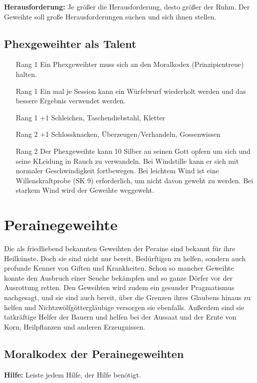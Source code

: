 \documentclass[../../Heldenanleitung2]{subfiles}
\begin{document}
\noindent
\textbf{Herausforderung:} Je größer die Herausforderung, desto
größer der Ruhm. Der Geweihte soll große Herausforderungen
suchen und sich ihnen stellen.

\subsection{Phexgeweihter als Talent}
\begin{itemize}
	\item[Rang 1] Ein Phexgeweihter muss sich an den Moralkodex
(Prinzipientreue) halten.
	\item[Rang 1] Ein mal je Session kann ein Würfelwurf wiederholt werden und das bessere Ergebnis verwendet werden.
	\item[Rang 1] +1 Schleichen, Taschendiebstahl, Kletter
	\item[Rang 2] +1 Schlossknacken, Überzeugen/Verhandeln, Gossenwissen
	\item[Rang 2] Der Phexgeweihte kann 10 Silber an seinen Gott opfern um sich und seine KLeidung in Rauch zu verwandeln. Bei Windstille kann er sich mit normaler Geschwindigkeit fortbewegen. Bei leichtem Wind ist eine Willenskraftprobe (SK 9) erforderlich, um nicht davon geweht zu werden. Bei starkem Wind wird der Geweihte weggeweht.
\end{itemize}

\section{Perainegeweihte}

Die als friedliebend bekannten
Geweihten der
Peraine sind bekannt
für ihre Heilkünste.
Doch sie sind nicht nur
bereit, Bedürftigen zu
helfen, sondern auch
profunde Kenner von
Giften und Krankheiten.
Schon so mancher Geweihte
konnte den Ausbruch einer
Seuche bekämpfen und so ganze Dörfer vor der Ausrottung
retten. Den Geweihten wird zudem ein gesunder
Pragmatismus nachgesagt, und sie sind auch bereit,
über die Grenzen ihres Glaubens hinaus zu helfen und
Nichtzwölfgöttergläubige versorgen sie ebenfalls. Außerdem sind sie tatkräftige Helfer der 
Bauern und helfen bei der Aussaat und der Ernte von
Korn, Heilpflanzen und anderen Erzeugnissen.

\subsection{Moralkodex der Perainegeweihten}
\textbf{Hilfe:} Leiste jedem Hilfe, der Hilfe benötigt.\\
\end{document}
